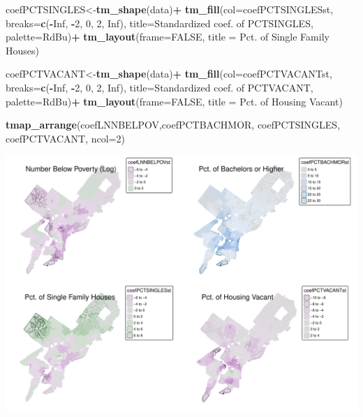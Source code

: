 \documentclass[
]{article}
\newenvironment{Shaded}{\begin{snugshade}}{\end{snugshade}}
\newcommand{\AttributeTok}[1]{\textcolor[rgb]{0.13,0.29,0.53}{#1}}
\newcommand{\ConstantTok}[1]{\textcolor[rgb]{0.56,0.35,0.01}{#1}}
\newcommand{\DecValTok}[1]{\textcolor[rgb]{0.00,0.00,0.81}{#1}}
\newcommand{\FunctionTok}[1]{\textcolor[rgb]{0.13,0.29,0.53}{\textbf{#1}}}
\newcommand{\NormalTok}[1]{#1}
\newcommand{\OtherTok}[1]{\textcolor[rgb]{0.56,0.35,0.01}{#1}}
\newcommand{\SpecialCharTok}[1]{\textcolor[rgb]{0.81,0.36,0.00}{\textbf{#1}}}
\newcommand{\StringTok}[1]{\textcolor[rgb]{0.31,0.60,0.02}{#1}}
\begin{document}
\begin{Shaded}
\begin{Highlighting}[]
\NormalTok{coefPCTSINGLES}\OtherTok{\textless{}{-}}\FunctionTok{tm\_shape}\NormalTok{(data)}\SpecialCharTok{+}
  \FunctionTok{tm\_fill}\NormalTok{(}\AttributeTok{col=}\StringTok{\textquotesingle{}coefPCTSINGLESst\textquotesingle{}}\NormalTok{, }\AttributeTok{breaks=}\FunctionTok{c}\NormalTok{(}\SpecialCharTok{{-}}\ConstantTok{Inf}\NormalTok{, }\SpecialCharTok{{-}}\DecValTok{2}\NormalTok{, }\DecValTok{0}\NormalTok{, }\DecValTok{2}\NormalTok{, }\ConstantTok{Inf}\NormalTok{), }\AttributeTok{title=}\StringTok{\textquotesingle{}Standardized coef. of PCTSINGLES\textquotesingle{}}\NormalTok{, }
          \AttributeTok{palette=}\StringTok{\textquotesingle{}{-}RdBu\textquotesingle{}}\NormalTok{)}\SpecialCharTok{+}
  \FunctionTok{tm\_layout}\NormalTok{(}\AttributeTok{frame=}\ConstantTok{FALSE}\NormalTok{, }\AttributeTok{title =} \StringTok{\textquotesingle{}Pct. of Single Family Houses\textquotesingle{}}\NormalTok{)}

\NormalTok{coefPCTVACANT}\OtherTok{\textless{}{-}}\FunctionTok{tm\_shape}\NormalTok{(data)}\SpecialCharTok{+}
  \FunctionTok{tm\_fill}\NormalTok{(}\AttributeTok{col=}\StringTok{\textquotesingle{}coefPCTVACANTst\textquotesingle{}}\NormalTok{, }\AttributeTok{breaks=}\FunctionTok{c}\NormalTok{(}\SpecialCharTok{{-}}\ConstantTok{Inf}\NormalTok{, }\SpecialCharTok{{-}}\DecValTok{2}\NormalTok{, }\DecValTok{0}\NormalTok{, }\DecValTok{2}\NormalTok{, }\ConstantTok{Inf}\NormalTok{), }\AttributeTok{title=}\StringTok{\textquotesingle{}Standardized coef. of PCTVACANT\textquotesingle{}}\NormalTok{, }
          \AttributeTok{palette=}\StringTok{\textquotesingle{}{-}RdBu\textquotesingle{}}\NormalTok{)}\SpecialCharTok{+}
  \FunctionTok{tm\_layout}\NormalTok{(}\AttributeTok{frame=}\ConstantTok{FALSE}\NormalTok{, }\AttributeTok{title =} \StringTok{\textquotesingle{}Pct. of Housing Vacant\textquotesingle{}}\NormalTok{)}

\FunctionTok{tmap\_arrange}\NormalTok{(coefLNNBELPOV,coefPCTBACHMOR, coefPCTSINGLES, coefPCTVACANT, }\AttributeTok{ncol=}\DecValTok{2}\NormalTok{)}
\end{Highlighting}
\end{Shaded}

\includegraphics{HW2-SpatialRegression_files/figure-latex/unnamed-chunk-11-1.pdf}
\end{document}
